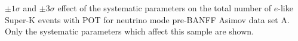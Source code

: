 \begin{table}
	\begin{adjustbox}{width=\textwidth, totalheight=\textheight, keepaspectratio}
		
	\end{adjustbox}
	\caption
	{
		$\pm1\sigma$ and $\pm3\sigma$ effect of the systematic parameters on the total number of $e$-like Super-K events with \RunPeriod POT for neutrino mode pre-BANFF Asimov data set A. Only the systematic parameters which affect this sample are shown.
	}
\end{table}\clearpage